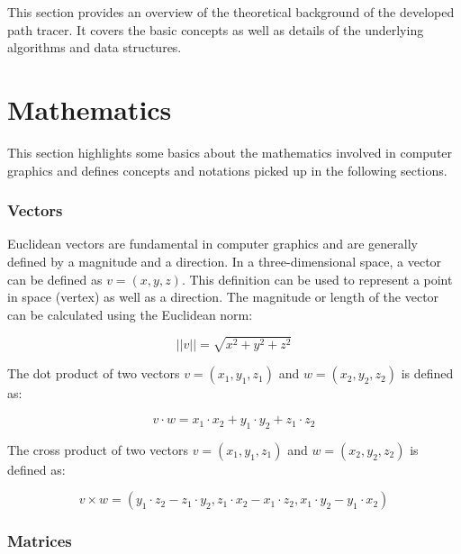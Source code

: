 
This section provides an overview of the theoretical background of the developed path tracer. It covers the basic concepts as well as details of the underlying algorithms and data structures.

\section{Mathematics}

This section highlights some basics about the mathematics involved in computer graphics and defines concepts and notations picked up in the following sections.

\subsubsection{Vectors}

Euclidean vectors are fundamental in computer graphics and are generally defined by a magnitude and a direction. In a three-dimensional space, a vector can be defined as $v = (x, y, z)$. This definition can be used to represent a point in space (vertex) as well as a direction. The magnitude or length of the vector can be calculated using the Euclidean norm:

\begin{equation}
  \label{eqn:euclidean-norm}
  ||v|| = \sqrt{x^2 + y^2 + z^2}
\end{equation}

The dot product of two vectors $v = (x_1, y_1, z_1)$ and $w = (x_2, y_2, z_2)$ is defined as:

\begin{equation}
  \label{eqn:dot-product}
  v \cdot w = x_1 \cdot x_2 + y_1 \cdot y_2 + z_1 \cdot z_2
\end{equation}

The cross product of two vectors $v = (x_1, y_1, z_1)$ and $w = (x_2, y_2, z_2)$ is defined as:

\begin{equation}
  \label{eqn:cross-product}
  v \times w = (y_1 \cdot z_2 - z_1 \cdot y_2, z_1 \cdot x_2 - x_1 \cdot z_2, x_1 \cdot y_2 - y_1 \cdot x_2)
\end{equation}

\subsubsection{Matrices}

